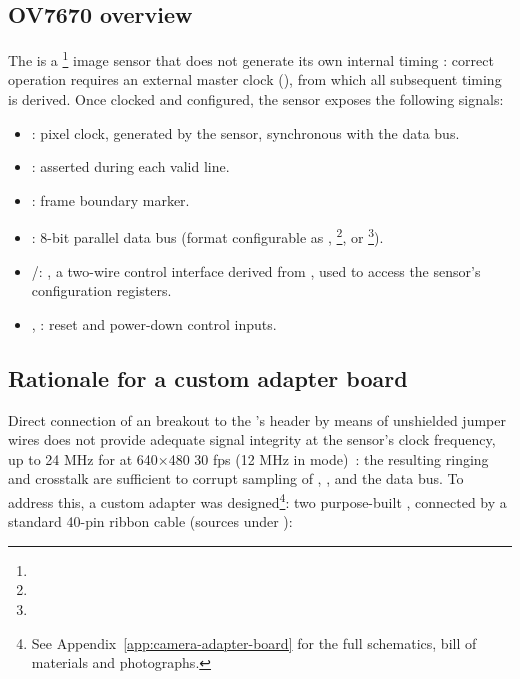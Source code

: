 \subsection{OV7670 overview}

The  is a  \footnote{} image sensor that does not generate its own internal timing \cite{OV7670-DS}: correct operation requires an external master clock (), from which all subsequent timing is derived. Once clocked and configured, the sensor exposes the following signals:

\begin{itemize}
    \item {}: pixel clock, generated by the sensor, synchronous with the data bus.
    \item {}: asserted during each valid line.
    \item {}: frame boundary marker.
    \item {}: 8-bit parallel data bus (format configurable as , \footnote{}, or \footnote{}).
    \item {}/: , a two-wire control interface derived from , used to access the sensor's configuration registers.
    \item {}, : reset and power-down control inputs.
\end{itemize}

\subsection{Rationale for a custom adapter board}

Direct connection of an  breakout to the 's  header by means of unshielded jumper wires does not provide adequate signal integrity at the sensor's clock frequency, up to 24 MHz for  at 640$\times$480 30 fps (12 MHz in  mode)~\cite[Table 3-3]{OV7670-IG}: the resulting ringing and crosstalk are sufficient to corrupt sampling of , , and the data bus. To address this, a custom adapter was designed\footnote{See Appendix~\ref{app:camera-adapter-board} for the full schematics, bill of materials and photographs.}: two purpose-built , connected by a standard 40-pin  ribbon cable (sources under ):


